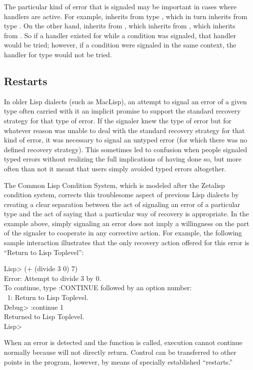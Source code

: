 The particular kind of error that is signaled may be important
in cases where handlers are active. For example,  inherits 
from type , which in turn inherits from type . On the 
other hand,  inherits from , which 
inherits from , which inherits from . So if a handler
existed for  while a  condition was
signaled, that handler would be tried; however, if a 
condition were signaled in the same context, the handler for type
 would not be tried.


\subsection{Restarts}
\label{RESTARTS}

In older Lisp dialects (such as MacLisp), an attempt to signal an error of a
given type often carried with it an implicit promise to support the standard
recovery strategy for that type of error. If the signaler knew the type of
error but for whatever reason was unable to deal with the standard recovery
strategy for that kind of error, it was necessary to signal an untyped error
(for which there was no defined recovery strategy). This sometimes led to
confusion when people signaled typed errors without realizing the full
implications of having done so, but more often than not it meant that users
simply avoided typed errors altogether.

The Common Lisp Condition System, which is modeled after the Zetalisp condition system,
corrects this troublesome aspect of previous Lisp dialects by creating a clear
separation between the act of signaling an error of a particular type and the
act of saying that a particular way of recovery is appropriate. In the 
example above, simply signaling an error does not imply a willingness on the
part of the signaler to cooperate in any corrective action. For example, the
following sample interaction illustrates that the only recovery action
offered for this error is ``Return to Lisp Toplevel'':
\begin{lisp}
Lisp> (+ (divide 3 0) 7) \\
Error: Attempt to divide 3 by 0. \\
To continue, type :CONTINUE followed by an option number: \\
~1: Return to Lisp Toplevel. \\
Debug> :continue 1 \\
Returned to Lisp Toplevel. \\
Lisp>
\end{lisp}
When an error is detected and the function  is called, execution cannot
continue normally because  will not directly return. Control can be
transferred to other points in the program, however, by means of specially
established ``restarts.''

